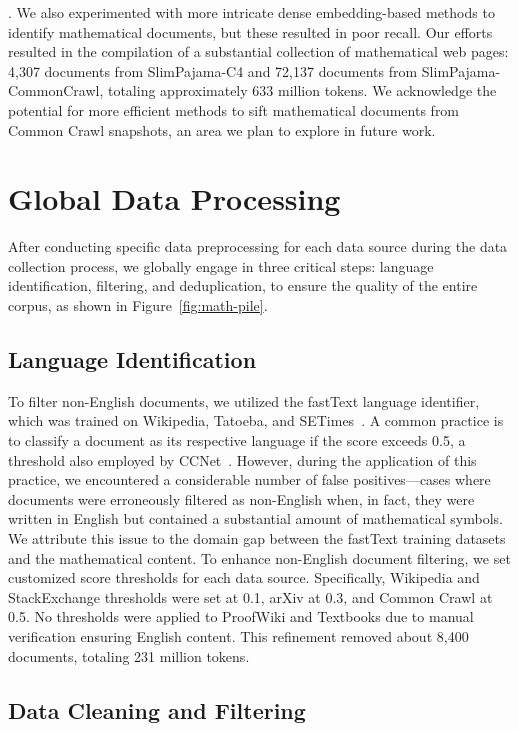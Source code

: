 . We also experimented with more intricate dense embedding-based methods to identify mathematical documents, but these resulted in poor recall. Our efforts resulted in the compilation of a substantial collection of mathematical web pages: 4,307 documents from SlimPajama-C4 and 72,137 documents from SlimPajama-CommonCrawl, totaling approximately 633 million tokens. We acknowledge the potential for more efficient methods to sift mathematical documents from Common Crawl snapshots, an area we plan to explore in future work.

\section{Global Data Processing}
\label{sec:global-data-processing}

After conducting specific data preprocessing for each data source during the data collection process, we globally engage in three critical steps: language identification,  filtering, and deduplication, to ensure the quality of the entire corpus, as shown in Figure~\ref{fig:math-pile}.

\subsection{Language Identification}

To filter non-English documents, we utilized the fastText language identifier, which was trained on Wikipedia, Tatoeba, and SETimes~\citep{joulin-etal-2017-fasttext,grave-etal-2018-learning-vector-157-languages}. A common practice is to classify a document as its respective language if the score exceeds 0.5, a threshold also employed by CCNet~\citep{wenzek-etal-2020-ccnet}. However, during the application of this practice, we encountered a considerable number of false positives—cases where documents were erroneously filtered as non-English when, in fact, they were written in English but contained a substantial amount of mathematical symbols. We attribute this issue to the domain gap between the fastText training datasets and the mathematical content. To enhance non-English document filtering, we set customized score thresholds for each data source. Specifically, Wikipedia and StackExchange thresholds were set at 0.1, arXiv at 0.3, and Common Crawl at 0.5. No thresholds were applied to ProofWiki and Textbooks due to manual verification ensuring English content. This refinement removed about 8,400 documents, totaling 231 million tokens.

\subsection{Data Cleaning and Filtering}

